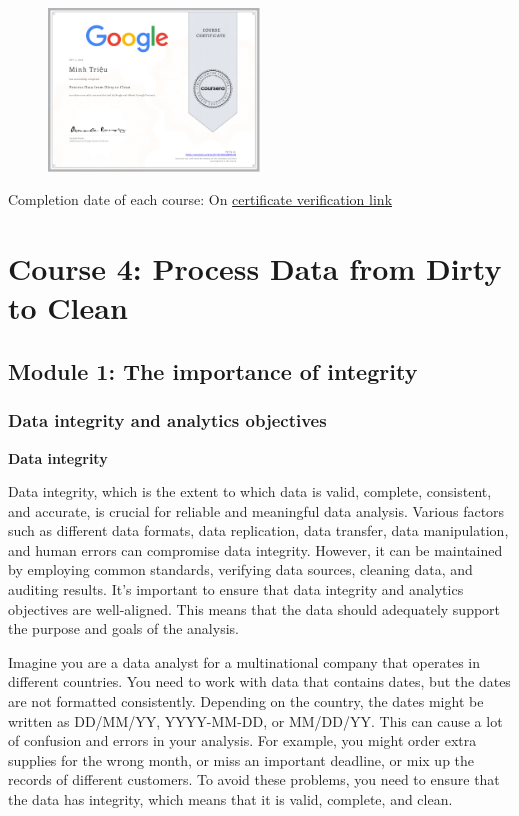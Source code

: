 \documentclass[]{article}
\begin{document}
\begin{figure}[H]
  \centering
  \includegraphics[width=0.5\textwidth]{certs/DYHS63889XUN.pdf}
\end{figure}

Completion date of each course: On \href{https://coursera.org/verify/DYHS63889XUN}{certificate verification link}

\section{Course 4: Process Data from Dirty to Clean}
\subsection{Module 1: The importance of integrity}
\subsubsection{Data integrity and analytics objectives}

\textbf{Data integrity}

Data integrity, which is the extent to which data is valid, complete, consistent, and accurate, is crucial for reliable and meaningful data analysis. Various factors such as different data formats, data replication, data transfer, data manipulation, and human errors can compromise data integrity. However, it can be maintained by employing common standards, verifying data sources, cleaning data, and auditing results. It’s important to ensure that data integrity and analytics objectives are well-aligned. This means that the data should adequately support the purpose and goals of the analysis.

Imagine you are a data analyst for a multinational company that operates in different countries. You need to work with data that contains dates, but the dates are not formatted consistently. Depending on the country, the dates might be written as DD/MM/YY, YYYY-MM-DD, or MM/DD/YY. This can cause a lot of confusion and errors in your analysis. For example, you might order extra supplies for the wrong month, or miss an important deadline, or mix up the records of different customers. To avoid these problems, you need to ensure that the data has integrity, which means that it is valid, complete, and clean.
\end{document}
